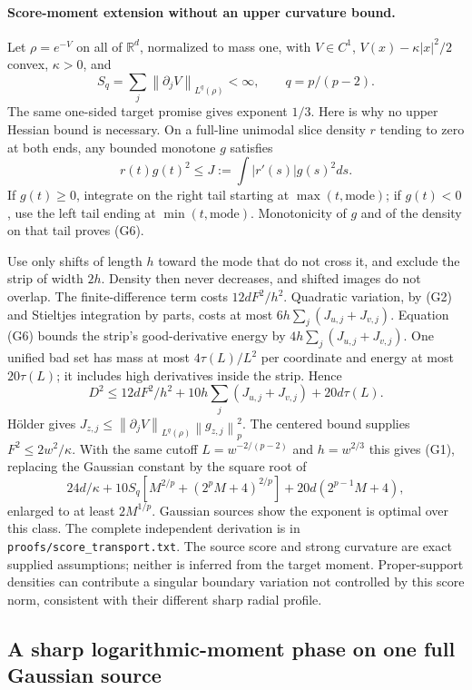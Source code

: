 \documentclass[11pt]{article}
\newcommand{\norm}[1]{\left\lVert#1\right\rVert}
\begin{document}
\paragraph{Score-moment extension without an upper curvature bound.}
Let $\rho=e^{-V}$ on all of $\mathbb R^d$, normalized to mass one, with $V\in C^1$, $V(x)-\kappa|x|^2/2$ convex, $\kappa>0$, and
\[
S_q=\sum_j\norm{\partial_jV}_{L^q(\rho)}<\infty,\qquad q=p/(p-2).
\]
The same one-sided target promise gives exponent $1/3$. Here is why no upper Hessian bound is necessary. On a full-line unimodal slice density $r$ tending to zero at both ends, any bounded monotone $g$ satisfies
\[
r(t)g(t)^2\le J:=\int|r'(s)|g(s)^2ds.
\tag{G6}
\]
If $g(t)\ge0$, integrate on the right tail starting at $\max(t,\text{mode})$; if $g(t)<0$, use the left tail ending at $\min(t,\text{mode})$. Monotonicity of $g$ and of the density on that tail proves (G6).

Use only shifts of length $h$ toward the mode that do not cross it, and exclude the strip of width $2h$. Density then never decreases, and shifted images do not overlap. The finite-difference term costs $12dF^2/h^2$. Quadratic variation, by (G2) and Stieltjes integration by parts, costs at most $6h\sum_j(J_{u,j}+J_{v,j})$. Equation (G6) bounds the strip's good-derivative energy by $4h\sum_j(J_{u,j}+J_{v,j})$. One unified bad set has mass at most $4\tau(L)/L^2$ per coordinate and energy at most $20\tau(L)$; it includes high derivatives inside the strip. Hence
\[
D^2\le12dF^2/h^2+10h\sum_j(J_{u,j}+J_{v,j})+20d\tau(L).
\tag{G7}
\]
H\"older gives $J_{z,j}\le\norm{\partial_jV}_{L^q(\rho)}\norm{g_{z,j}}_p^2$. The centered bound supplies $F^2\le2w^2/\kappa$. With the same cutoff $L=w^{-2/(p-2)}$ and $h=w^{2/3}$ this gives (G1), replacing the Gaussian constant by the square root of
\[
24d/\kappa+10S_q[M^{2/p}+(2^pM+4)^{2/p}]+20d(2^{p-1}M+4),
\]
enlarged to at least $2M^{1/p}$. Gaussian sources show the exponent is optimal over this class. The complete independent derivation is in \texttt{proofs/score\_transport.txt}. The source score and strong curvature are exact supplied assumptions; neither is inferred from the target moment. Proper-support densities can contribute a singular boundary variation not controlled by this score norm, consistent with their different sharp radial profile.

\subsection{A sharp logarithmic-moment phase on one full Gaussian source}
\end{document}
